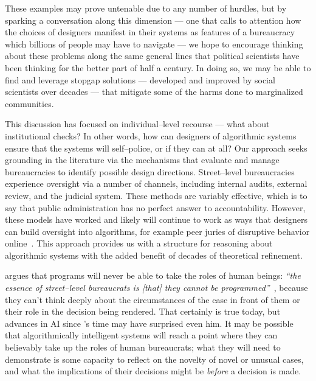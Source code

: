 \documentclass[street-level_algorithms]{subfiles}
\begin{document}
These examples may prove untenable due to any number of hurdles, but
by sparking a conversation along this dimension
--- one that calls to attention how
the choices of designers manifest in their systems as
features of a bureaucracy which billions of people may have to navigate ---
we hope to encourage thinking about these problems
along the same general lines that
political scientists have been thinking for the better part of half a century.
In doing so, we may be able to find and leverage stopgap solutions
--- developed and improved by social scientists over decades ---
that mitigate some of the harms done to marginalized communities.

This discussion has focused on individual--level recourse --- what about institutional checks?
In other words, how can designers of algorithmic systems ensure that the systems will self--police, or if they can at all?
Our approach seeks grounding in the literature via the mechanisms that evaluate and manage bureaucracies to identify possible design directions.
Street--level bureaucracies experience oversight via a number of channels, including internal audits, external review, and the judicial system.
These methods are variably effective, which is to say that public administration has no perfect answer to accountability.
However, these models have worked and likely will continue to work
as ways that designers can build oversight into algorithms,
for example peer juries of disruptive behavior online~\cite{Kou:2017:MDB:3171581.3134697}.
This approach provides us with a structure for reasoning about algorithmic systems with the added benefit of decades of theoretical refinement.


\citeauthor{lipsky1983street} argues that programs will never be able to take the roles of human beings:
\textit{``the essence of street--level bureaucrats is [that] they cannot be programmed''}~\cite{lipsky1983street},
because they can't think deeply about the circumstances of the case in front of them or their role in the decision being rendered.
That certainly is true today, but advances in AI since \citeauthor{lipsky1983street}'s time may have surprised even him.
It may be possible that algorithmically intelligent systems will reach a point where they can believably take up the roles of human bureaucrats;
what they will need to demonstrate is some capacity to reflect on the novelty of novel or unusual cases, and
what the implications of their decisions might be \textit{before} a decision is made.


\onlyinsubfile{
  
  
}
\end{document}
